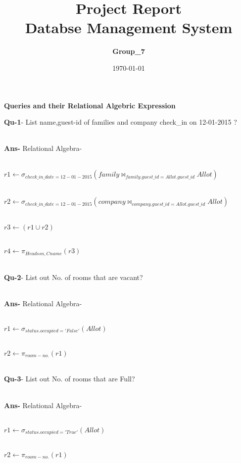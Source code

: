\documentclass[a4,12pt]{report}
\title{ Project Report \\
						\textbf{Databse Management System\\}
						}
\author{\textbf{Group\_7}}
\date{\today}
\begin{document}
\maketitle

\newpage
\begin{center}
 \textbf{Queries and their Relational Algebric Expression}
\end{center}

\begin{flushleft}
 \textbf{Qu-1}- List name,guest-id of families and company check\_in on 12-01-2015 ? \\\
 
  \textbf{Ans-} Relational Algebra- \\\ 
  
                  $ r1 \leftarrow \sigma_{check\_in\_date = 12-01-2015}(family \bowtie_{family.guest\_id = Allot.guest\_id} Allot ) $  \\\
                  
              $ r2 \leftarrow \sigma_{check\_in\_date = 12-01-2015}(company \bowtie_{company.guest\_id = Allot.guest\_id} Allot ) $ \\\
              
              $ r3 \leftarrow ( r1 \cup r2)$  \\\
              
              $ r4 \leftarrow \pi_{Headssn,Cname}(r3)  $ \\\
              
 \textbf{ Qu-2}- List out No. of rooms that are vacant? \\\
 
 \textbf{Ans-} Relational Algebra- \\\
 
 			$ r1 \leftarrow \sigma_{status.occupied = ' False '}(Allot)$ \\\
 			
 			$ r2 \leftarrow \pi_{room-no.}(r1)$ \\\
 			
 \textbf{ Qu-3}- List out No. of rooms that are Full? \\\
 
 \textbf{Ans-} Relational Algebra- \\\
 
 			$ r1 \leftarrow \sigma_{status.occupied = ' True '}(Allot)$ \\\
 			
 			$ r2 \leftarrow \pi_{room-no.}(r1)$ \\\
 			

\end{flushleft}
\end{document}
